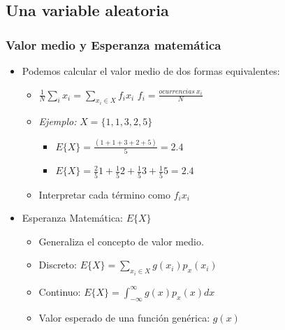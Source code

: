 \subsection{Una variable aleatoria}

\begin{frame}
\frametitle{Valor medio y Esperanza matemática}

  \begin{itemize}
    \item Podemos calcular el valor medio de dos formas equivalentes:
    \begin{itemize} 
      \item $\frac{1}{N}\sum_{i}x_i=\sum_{x_i\in X}f_i x_i$ $f_i=\frac{ocurrencias~x_i}{N}$
      \item \emph{Ejemplo:} $X = \{1, 1, 3, 2, 5\}$
      \begin{itemize}
        \item $E\{X\}=\frac{(1+1+3+2+5)}{5}=2.4$
        \item $E\{X\}=\frac{2}{5}1+\frac{1}{5}2+\frac{1}{5}3+\frac{1}{5}5=2.4$
      \end{itemize}
      \item Interpretar cada término como $f_i x_i$
    \end{itemize}
    \item Esperanza Matemática: $E\{X\}$
    \begin{itemize}
      \item Generaliza el concepto de valor medio.
      \item Discreto: $E\{X\}=\sum_{x_i\in X}g(x_i)p_{x}(x_i)$
      \item Continuo: $E\{X\}=\int_{-\infty}^{\infty}g(x)p_{x}(x)dx$
      \item Valor esperado de una función genérica: $g(x)$
    \end{itemize}
  \end{itemize}







\end{frame}
